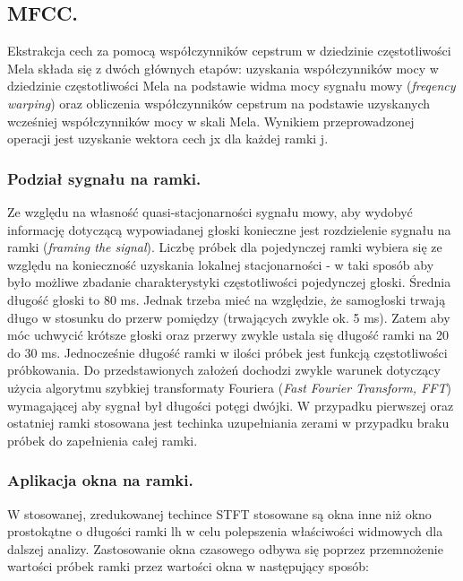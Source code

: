 \subsection{MFCC.}



Ekstrakcja cech za pomocą współczynników cepstrum w dziedzinie częstotliwości Mela składa się z dwóch głównych etapów: uzyskania współczynników mocy w dziedzinie częstotliwości Mela na podstawie widma mocy sygnału mowy (\textit{freqency warping}) oraz obliczenia współczynników cepstrum na podstawie uzyskanych wcześniej współczynników mocy w skali Mela. Wynikiem przeprowadzonej operacji jest uzyskanie wektora cech jx dla każdej ramki j.
%

\subsubsection{Podział sygnału na ramki.}
Ze względu na własność quasi-stacjonarności sygnału mowy, aby wydobyć informację dotyczącą wypowiadanej głoski konieczne jest rozdzielenie sygnału na ramki (\textit{framing the signal}).
Liczbę próbek dla pojedynczej ramki wybiera się ze względu na konieczność uzyskania lokalnej stacjonarności - w taki sposób aby było możliwe zbadanie charakterystyki częstotliwości pojedynczej głoski. Średnia długość głoski to 80 ms. Jednak trzeba mieć na względzie, że samogłoski trwają długo w stosunku do przerw pomiędzy (trwających zwykle ok. 5 ms). Zatem aby móc uchwycić krótsze głoski oraz przerwy zwykle ustala się długość ramki na 20 do 30 ms. Jednocześnie długość ramki w ilości próbek jest funkcją częstotliwości próbkowania. Do przedstawionych założeń dochodzi zwykle warunek dotyczący użycia algorytmu szybkiej transformaty Fouriera (\textit{Fast Fourier Transform, FFT}) wymagającej aby sygnał był długości potęgi dwójki. W przypadku pierwszej oraz ostatniej ramki stosowana jest techinka uzupełniania zerami w przypadku braku próbek do zapełnienia całej ramki.

\subsubsection{Aplikacja okna na ramki.}
W stosowanej, 
zredukowanej techince STFT stosowane są okna inne niż okno prostokątne o długości ramki lh w celu polepszenia właściwości widmowych dla dalszej analizy. Zastosowanie okna czasowego odbywa się poprzez przemnożenie wartości próbek ramki przez wartości okna w następujący sposób:

